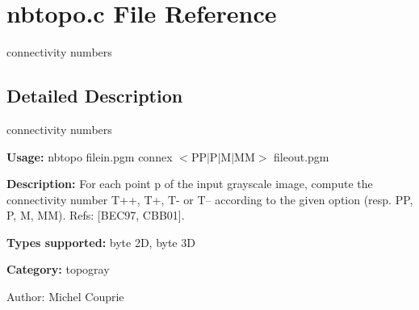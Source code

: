 \section{nbtopo.c File Reference}
\label{nbtopo_8c}
connectivity numbers 



\subsection{Detailed Description}
connectivity numbers 

{\bf Usage:} nbtopo filein.pgm connex $<$PP$|$P$|$M$|$MM$>$ fileout.pgm

{\bf Description:} For each point p of the input grayscale image, compute the connectivity number T++, T+, T- or T-- according to the given option (resp. PP, P, M, MM). Refs: [BEC97, CBB01].

{\bf Types supported:} byte 2D, byte 3D

{\bf Category:} topogray

\begin{Desc}
\item[Author:]Michel Couprie \end{Desc}
